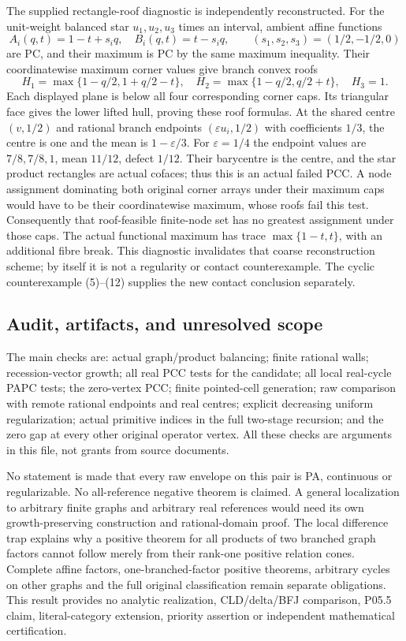 \documentclass[
  10pt,
]{article}
\begin{document}
The supplied rectangle-roof diagnostic is independently reconstructed.
For the unit-weight balanced star \(u_1,u_2,u_3\) times an interval,
ambient affine functions \[
 A_i(q,t)=1-t+s_iq,\quad B_i(q,t)=t-s_iq,
 \qquad(s_1,s_2,s_3)=(1/2,-1/2,0)
\] are PC, and their maximum is PC by the same maximum inequality. Their
coordinatewise maximum corner values give branch convex roofs \[
 H_1=\max\{1-q/2,1+q/2-t\},\quad
 H_2=\max\{1-q/2,q/2+t\},\quad H_3=1.
\] Each displayed plane is below all four corresponding corner caps. Its
triangular face gives the lower lifted hull, proving these roof
formulas. At the shared centre \((v,1/2)\) and rational branch endpoints
\((\varepsilon u_i,1/2)\) with coefficients \(1/3\), the centre is one
and the mean is \(1-\varepsilon/3\). For \(\varepsilon=1/4\) the
endpoint values are \(7/8,7/8,1\), mean \(11/12\), defect \(1/12\).
Their barycentre is the centre, and the star product rectangles are
actual cofaces; thus this is an actual failed PCC. A node assignment
dominating both original corner arrays under their maximum caps would
have to be their coordinatewise maximum, whose roofs fail this test.
Consequently that roof-feasible finite-node set has no greatest
assignment under those caps. The actual functional maximum has trace
\(\max\{1-t,t\}\), with an additional fibre break. This diagnostic
invalidates that coarse reconstruction scheme; by itself it is not a
regularity or contact counterexample. The cyclic counterexample
(5)--(12) supplies the new contact conclusion separately.

\subsection{Audit, artifacts, and unresolved
scope}\label{audit-artifacts-and-unresolved-scope}

The main checks are: actual graph/product balancing; finite rational
walls; recession-vector growth; all real PCC tests for the candidate;
all local real-cycle PAPC tests; the zero-vertex PCC; finite
pointed-cell generation; raw comparison with remote rational endpoints
and real centres; explicit decreasing uniform regularization; actual
primitive indices in the full two-stage recursion; and the zero gap at
every other original operator vertex. All these checks are arguments in
this file, not grants from source documents.

No statement is made that every raw envelope on this pair is PA,
continuous or regularizable. No all-reference negative theorem is
claimed. A general localization to arbitrary finite graphs and arbitrary
real references would need its own growth-preserving construction and
rational-domain proof. The local difference trap explains why a positive
theorem for all products of two branched graph factors cannot follow
merely from their rank-one positive relation cones. Complete affine
factors, one-branched-factor positive theorems, arbitrary cycles on
other graphs and the full original classification remain separate
obligations. This result provides no analytic realization, CLD/delta/BFJ
comparison, P05.5 claim, literal-category extension, priority assertion
or independent mathematical certification.
\end{document}
